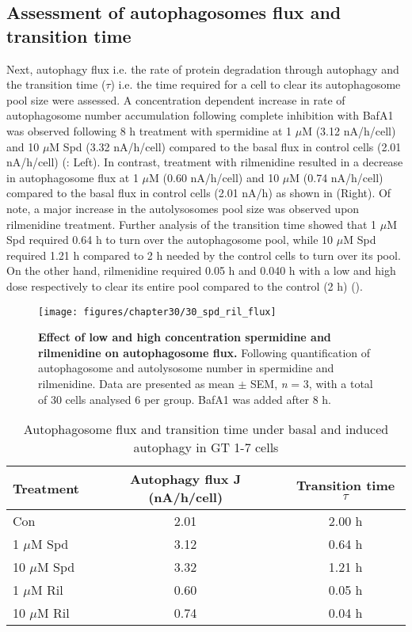 {\subsection{Assessment of autophagosomes flux and transition time}
Next, autophagy flux i.e. the rate of protein degradation through autophagy \citep{klionsky2016,loos2014} and the transition time ($\tau$) i.e. the time required for a cell to clear its autophagosome pool size \citep{DuToit2018b,loos2014} were assessed. A concentration dependent increase in rate of autophagosome number accumulation following complete inhibition with BafA1 was observed following 8 h treatment with spermidine at 1 $\mu$M (3.12 nA/h/cell) and 10 $\mu$M Spd (3.32 nA/h/cell) compared to the basal flux in control cells (2.01 nA/h/cell) (: Left). In contrast, treatment with rilmenidine resulted in a decrease in autophagosome flux at 1 $\mu$M (0.60 nA/h/cell) and 10 $\mu$M (0.74 nA/h/cell) compared to the basal flux in control cells (2.01 nA/h) as shown in  (Right). Of note, a major increase in the autolysosomes pool size was observed upon rilmenidine treatment. Further analysis of the transition time showed that 1 $\mu$M Spd required 0.64 h to turn over the autophagosome pool, while 10 $\mu$M Spd required 1.21 h compared to 2 h needed by the control cells to turn over its pool. On the other hand, rilmenidine required 0.05 h and 0.040 h with a low and high dose respectively to clear its entire pool compared to the control (2 h) ().

\begin{figure}[!htbp]
\center
  \texttt{[image: figures/chapter30/30\_spd\_ril\_flux]}
  \caption[Effect of low and high concentration spermidine and rilmenidine on autophagosome flux]{\textbf{Effect of low and high concentration spermidine and rilmenidine on autophagosome flux.} Following quantification of autophagosome and autolysosome number in spermidine and rilmenidine. Data are presented as mean $\pm$ SEM, \textit{n} = 3, with a total of 30 cells analysed 6 per group. BafA1 was added after 8 h.}
  \label{fig:30_spd_ril_flux}
\end{figure} 

\begin{table}[!htbp]
\centering
\caption[Autophagosome flux and transition time under basal and induced autophagy in GT 1-7 cells]{Autophagosome flux and transition time under basal and induced autophagy in GT 1-7 cells}
\label{tab:30_flux}
  \begin{tabular}{lcc}
\toprule
Treatment & Autophagy flux J (nA/h/cell) & Transition time $\tau$\\
\midrule
Con & 2.01 & 2.00 h \\
1 $\mu$M Spd & 3.12 & 0.64 h \\
10 $\mu$M Spd & 3.32 & 1.21 h \\
1 $\mu$M Ril & 0.60 & 0.05 h \\
10 $\mu$M Ril & 0.74 & 0.04 h \\
\end{tabular}
\end{table}

}

